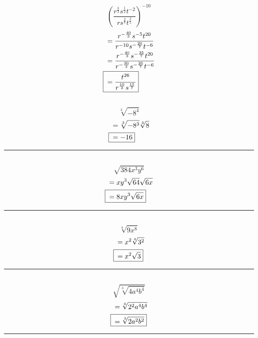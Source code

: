 	\subsection{}
		\[{\left(\frac{r^{\frac{4}{3}}s^{\frac{1}{2}}t^{-2}}{rs^{\frac{2}{7}}t^{\frac{3}{5}}}\right)}^{-10}\]
		\begin{align*}
			&= \frac{r^{-\frac{40}{3}}s^{-5}t^{20}}{r^{-10}s^{-\frac{20}{7}}t^{-6}} \\
			&= \frac{r^{-\frac{40}{3}}s^{-\frac{35}{7}}t^{20}}{r^{-\frac{30}{3}}s^{-\frac{20}{7}}t^{-6}} \\
			\Aboxed{{} &= \frac{t^{26}}{r^{\frac{10}{3}}s^{\frac{15}{7}}}}
		\end{align*}

	\subsection{}
		\[\sqrt[3]{-8^4}\]
		\begin{align*}
			&= \sqrt[3]{-8^3}\sqrt[3]{8} \\
			\Aboxed{{} &= -16}
		\end{align*}
		\hrule{}

	\subsection{}
		\[\sqrt{384x^3y^6}\]
		\begin{align*}
			&= xy^3\sqrt{64}\sqrt{6x} \\
			\Aboxed{{} &= 8xy^3\sqrt{6x}}
		\end{align*}
		\hrule{}

	\subsection{}
		\[\sqrt[4]{9x^8}\]
		\begin{align*}
			&= x^2\sqrt[4]{3^2} \\
			\Aboxed{{} &= x^2\sqrt{3}}
		\end{align*}
		\hrule{}

	\subsection{}
		\[\sqrt{\sqrt[3]{4a^4b^4}}\]
		\begin{align*}
			&= \sqrt[6]{2^2a^4b^4} \\
			\Aboxed{{} &= \sqrt[3]{2a^2b^2}}
		\end{align*}
		\hrule{}

